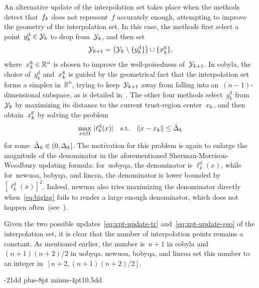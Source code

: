 \documentclass[
    smallextended,  %
    final,          %
]{svjour3}
\makeatletter
\newcommand{\R}{\mathbb{R}}
\newcommand{\abs}[2][]{#1\lvert#2#1\rvert}
\newcommand{\drop}{{\text{d}}}
\newcommand{\fset}{\Omega}
\newcommand{\geo}{{\text{g}}}
\newcommand{\iter}[1][k]{x\ifthenelse{\equal{#1}{}}{}{_{#1}}}
\newcommand{\norm}[2][]{#1\lVert#2#1\rVert}
\newcommand{\objm}[1][k]{\obj\ifthenelse{\equal{#1}{}}{}{_{#1}}}
\newcommand{\obj}{f}
\newcommand{\radalt}[1][k]{\bar{\Delta}\ifthenelse{\equal{#1}{}}{}{_{#1}}}
\newcommand{\rad}[1][k]{\Delta\ifthenelse{\equal{#1}{}}{}{_{#1}}}
\newcommand{\set}[2][]{#1\{#2#1\}}
\newcommand{\st}{\text{s.t.}}
\newcommand{\xpt}[1][k]{\mathcal{Y}\ifthenelse{\equal{#1}{}}{}{_{#1}}}
\def\subsection{\@startsection{subsection}{2}{\z@}%
    {-21dd plus-8pt minus-4pt}{10.5dd}
     {\normalsize\bfseries}}
\makeatother
\begin{document}
An alternative update of the interpolation set takes place
when the methods detect that~$\objm$ does not represent~$\obj$ accurately enough, attempting
to improve the geometry of the interpolation set.
In this case, the methods first select a point~$y_k^{\drop} \in \xpt$ to drop from~$\xpt$, and then set
\begin{equation}
    \label{eq:xpt-update-geo}
    \xpt[k + 1] = \big(\xpt \setminus \set{y_k^{\drop}}\big) \cup \set{\iter^{\geo}},
\end{equation}
where~$\iter^{\geo} \in \R^n$ is chosen to improve the well-poisedness of~$\xpt[k + 1]$.
In \gls{cobyla}, the choice of~$y_k^{\drop}$ and~$\iter^{\geo}$ is guided by the geometrical fact
that the interpolation set forms a simplex in~$\R^n$, trying to keep~$\xpt[k+1]$ away from falling into
an~$(n-1)$-dimensional subspace, as is detailed in~\cite[equations~(15)--(17)]{Powell_1994}.
The other four methods select~$y_k^{\drop}$ from~$\xpt$ by maximizing its distance to
the current trust-region center~$\iter$, and then obtain~$\iter^{\geo}$ by solving the problem
\begin{equation}
    \label{eq:biglag}
        \max_{x \in \fset}   ~\abs{\ell_k^{\drop}(x)} \quad \st \quad  \norm{x - \iter} \le \radalt
\end{equation}
for some~$\radalt \in (0, \rad]$.
The motivation for this problem is again to enlarge the magnitude of the
denominator in the aforementioned Sherman-Morrison-Woodbury updating formula:
for~\gls{uobyqa}, the denominator is $\ell_k^{\drop}(x)$, while for~\gls{newuoa}, \gls{bobyqa},
and \gls{lincoa}, the denominator is lower bounded by $[\ell_k^{\drop}(x)]^2$.
Indeed, \gls{newuoa} also tries maximizing the denominator directly when~\eqref{eq:biglag}
fails to render a large enough denominator, which does not happen often~(see~\cite[\S~6]{Powell_2006}).

Given the two possible updates~\eqref{eq:xpt-update-tr} and~\eqref{eq:xpt-update-geo} of the
interpolation set, it is clear that the number of interpolation points remains a constant.
As mentioned earlier, the number is~$n+1$ in \gls{cobyla} and~$(n+1)(n+2)/2$ in \gls{uobyqa}.
\gls{newuoa}, \gls{bobyqa}, and \gls{lincoa} set this number to an integer in~$[n+2, (n+1)(n+2)/2]$.


\subsection{}
\label{ssec:cobyla}
\end{document}
